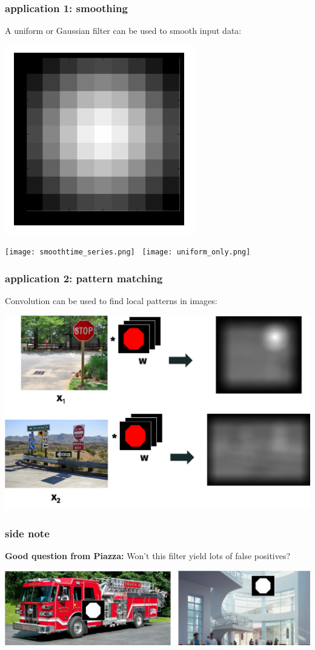 \documentclass[handout,compress]{beamer}
\begin{document}
	\begin{frame}
		\frametitle{application 1: smoothing}
		A uniform or Gaussian filter can be used to smooth input data:
			\begin{center}
			\includegraphics[width=.2\textwidth]{gaussian_filter.png}
			
			
			\texttt{[image: smoothtime\_series.png]}~ \texttt{[image: uniform\_only.png]}
		\end{center}
	\end{frame} 

	\begin{frame}
	\frametitle{application 2: pattern matching}
	Convolution can be used to find local patterns in images:
	\begin{center}
		\includegraphics[width=.8\textwidth]{pattern_match.png}
	\end{center}
\end{frame} 

	\begin{frame}
	\frametitle{side note}
	\textbf{Good question from Piazza:} Won't this filter yield lots of false positives?
	\begin{center}
		\includegraphics[width=.8\textwidth]{false_positive.png}
	\end{center}
	\end{frame}
\end{document}
